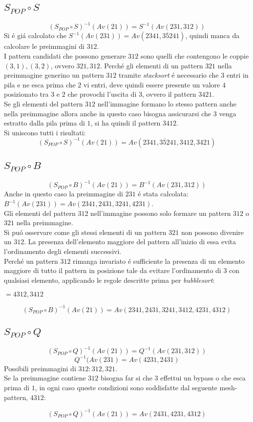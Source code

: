 \subsection*{$S_{POP}\circ{S}$}$$(S_{POP}\circ{S})^{-1}(Av(21))=S^{-1}(Av(231,312))$$
Si \'e gi\'a calcolato che $S^{-1}(Av(231))=Av(2341, 3\overline{5}241)$, quindi manca da calcolare le preimmagini di $312$.\\
I pattern candidati che possono generare $312$ sono quelli che contengono le coppie $(3,1),(3,2)$, ovvero $321, 312$.
Perch\'e gli elementi di un pattern $321$ nella preimmagine generino un pattern $312$ tramite \textit{stacksort} \'e necessario che $3$ entri in pila e ne esca prima che $2$ vi entri, deve quindi essere presente un valore $4$ posizionato tra $3$ e $2$ che provochi l'uscita di $3$, ovvero il pattern $3421$.\\
Se gli elementi del pattern $312$ nell'immagine formano lo stesso pattern anche nella preimmagine allora anche in questo caso bisogna assicurarsi che $3$ venga estratto dalla pila prima di $1$, si ha quindi il pattern $3412$.\\Si uniscono tutti i risultati:
$$(S_{POP}\circ{S})^{-1}(Av(21))=Av(2341, 3\overline{5}241, 3412, 3421)$$
\subsection*{$S_{POP}\circ{B}$}$$(S_{POP}\circ{B})^{-1}(Av(21))=B^{-1}(Av(231,312))$$
Anche in questo caso la preimmagine di $231$ \'e stata calcolata: $B^{-1}(Av(231))= Av(2341, 2431, 3241, 4231)$.\\
Gli elementi del pattern $312$ nell'immagine possono solo formare un pattern $312$ o $321$ nella preimmagine.\\
Si pu\'o osservare come gli stessi elementi di un pattern $321$ non possono divenire un $312$. La presenza dell'elemento maggiore del pattern all'inizio di essa evita l'ordinamento degli elementi successivi.\\
Perch\'e un pattern $312$ rimanga invariato \'e sufficiente la presenza di un elemento maggiore di tutto il pattern in posizione tale da evitare l'ordinamento di $3$ con qualsiasi elemento, applicando le regole descritte prima per \textit{bubblesort}: 
\begin{center}
$=4312,3412$
\end{center}
$$(S_{POP}\circ{B})^{-1}(Av(21))=Av(2341, 2431, 3241, 3412, 4231, 4312)$$
\subsection*{$S_{POP}\circ{Q}$}$$(S_{POP}\circ{Q})^{-1}(Av(21))=Q^{-1}(Av(231,312))$$$$Q^{-1}(Av(231)=Av(4231,2431)$$
Possibili preimmagini di $312: 312, 321$.\\
Se la preimmagine contiene $312$ bisogna far si che $3$ effettui un bypass o che esca prima di $1$, in ogni caso queste condizioni sono soddisfatte dal seguente mesh-pattern, $4312$:
\begin{center}
\end{center}
$$(S_{POP}\circ{Q})^{-1}(Av(21))=Av(2431,4231,4312)$$
